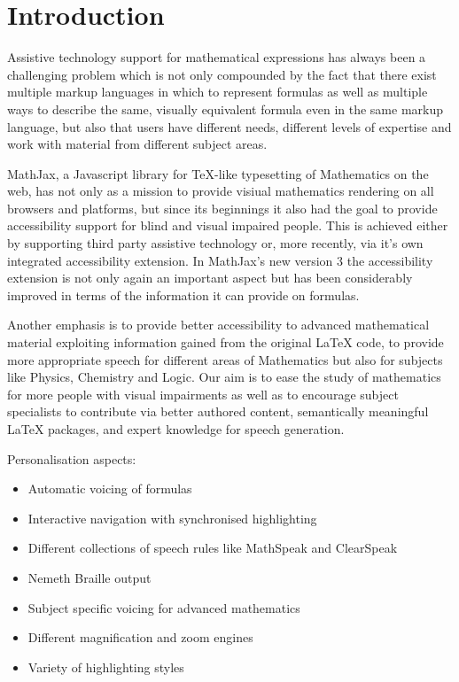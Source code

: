 \documentclass{sig-alternate}
\begin{document}
\section{Introduction}

Assistive technology support for mathematical expressions has always been a
challenging problem which is not only compounded by the fact that there exist
multiple markup languages in which to represent formulas as well as multiple ways to
describe the same, visually equivalent formula even in the same markup
language, but also that users have different needs, different levels of
expertise and work with material from different subject areas.

MathJax, a Javascript library for TeX-like typesetting of Mathematics on the
web, has not only as a mission to provide visiual mathematics rendering on all
browsers and platforms, but since its beginnings it also had the goal to provide
accessibility support for blind and visual impaired people. This is achieved
either by supporting third party assistive technology or, more recently, via
it's own integrated accessibility extension. In MathJax's new version 3 the
accessibility extension is not only again an important aspect but has been
considerably improved in terms of the information it can provide on formulas.

Another emphasis is to provide better accessibility to advanced mathematical
material exploiting information gained from the original LaTeX code, to provide
more appropriate speech for different areas of Mathematics but also for subjects
like Physics, Chemistry and Logic.  Our aim is to ease the study of mathematics
for more people with visual impairments as well as to encourage subject
specialists to contribute via better authored content, semantically meaningful
LaTeX packages, and expert knowledge for speech generation.


Personalisation aspects:


\begin{itemize}
\item Automatic voicing of formulas
\item Interactive navigation with synchronised highlighting
\item Different collections of speech rules like MathSpeak and ClearSpeak
\item Nemeth Braille output
\item Subject specific voicing for advanced mathematics
\item Different magnification and zoom engines
\item Variety of highlighting styles
\end{itemize}
\end{document}
